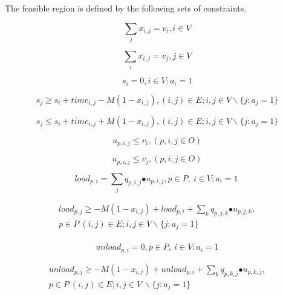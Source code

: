 The feasible region is defined by the following sets of constraints.

\begin{equation}
\sum_{j}{x_{i,j}=v_i}, i\in V
\label{VRP_1}
\end{equation}

\begin{equation}
\sum_{i}{x_{i,j}=v_j}, j\in V
\label{VRP_2}
\end{equation}

\begin{equation}
s_i=0, i\in V:a_i=1
\label{VRP_3}
\end{equation}

\begin{equation}
s_j\geq s_i+time_{i,j}-M(1-x_{i,j}), \left(i,j\right)\in E;i,j\in V \backslash \{j:a_j=1\}
\label{VRP_4}
\end{equation}

\begin{equation}
s_j\le s_i+time_{i,j}+M(1-x_{i,j}), \left(i,j\right)\in E;i,j\in V \backslash \{j:a_j=1\}
\label{VRP_5}
\end{equation}

\begin{equation}
u_{p,i,j}\le v_i, (p,i,j\in O)
\label{VRP_6}
\end{equation}

\begin{equation}
u_{p,i,j}\le v_j, (p,i,j\in O)
\label{VRP_7}
\end{equation}

\begin{equation}
load_{p,i}=\sum_{j}{q_{p,i,j}{\bullet u}_{p,i,j}}, p\in P,\ i\in V:a_i=1\ 
\label{VRP_8}
\end{equation}

\begin{equation}
\begin{split}
load_{p,j}\geq-M\left(1-x_{i,j}\right)+load_{p,i}+\sum_{k} q_{p,j,k}{\bullet u}_{p,j,k}, \\
p\in P\ \left(i,j\right)\in E;i,j\in V \backslash \{j:a_j=1\}\\
\end{split}
\label{VRP_9}
\end{equation}

\begin{equation}
unload_{p,i}=0, p\in P,\ i\in V:a_i=1
\label{VRP_10}
\end{equation}

\begin{equation}
\begin{split}
unload_{p,j}\geq-M\left(1-x_{i,j}\right)+unload_{p,i}+\sum_{k} q_{p,k,j}{\bullet u}_{p,k,j},\\
p\in P\ \left(i,j\right)\in E;i,j\in V\ \backslash \{j:a_j=1\}\\
\end{split}
\label{VRP_11}
\end{equation}

